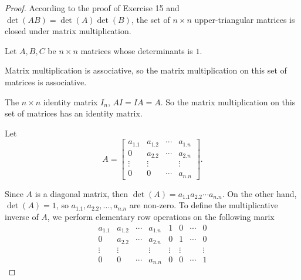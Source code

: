 \begin{proof}
    According to the proof of Exercise 15 and $\det(AB) = \det(A)\det(B)$, the set of $n\times n$ upper-triangular matrices is closed under matrix multiplication.

    Let $A, B, C$ be $n\times n$ matrices whose determinants is $1$.

    Matrix multiplication is associative, so the matrix multiplication on this set of matrices is associative.

    The $n\times n$ identity matrix $I_{n}$, $AI = IA = A$. So the matrix multiplication on this set of matrices has an identity matrix.

    Let
    \[
        A = \begin{bmatrix}
            a_{1.1} & a_{1.2} & \cdots & a_{1.n} \\
            0       & a_{2.2} & \cdots & a_{2.n} \\
            \vdots  & \vdots  &        & \vdots  \\
            0       & 0       & \cdots & a_{n.n}
        \end{bmatrix}.
    \]

    Since $A$ is a diagonal matrix, then $\det(A) = a_{1.1}a_{2.2}\cdots a_{n.n}$. On the other hand, $\det(A) = 1$, so $a_{1.1}, a_{2.2}, \ldots, a_{n.n}$ are non-zero. To define the multiplicative inverse of $A$, we perform elementary row operations on the following marix
    \[
        \begin{array}{cccc|cccc}
            a_{1.1} & a_{1.2} & \cdots & a_{1.n} & 1      & 0      & \cdots & 0      \\
            0       & a_{2.2} & \cdots & a_{2.n} & 0      & 1      & \cdots & 0      \\
            \vdots  & \vdots  &        & \vdots  & \vdots & \vdots &        & \vdots \\
            0       & 0       & \cdots & a_{n.n} & 0      & 0      & \cdots & 1
        \end{array}
    \]


\end{proof}
